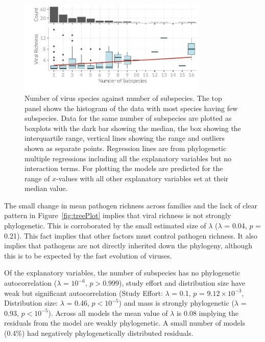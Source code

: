 \begin{knitrout}\footnotesize
{}\color{fgcolor}\begin{figure}[t]

{\centering \includegraphics[width=0.8\textwidth]{figure/boxplot-1} 

}

\caption[Number of virus species against number of subspecies]{Number of virus species against number of subspecies. 		
The top panel shows the histogram of the data with most species having few subspecies.		
Data for the same number of subspecies are plotted as boxplots with the dark bar showing the median, the box showing the interquartile range, vertical lines showing the range and outliers shown as separate points.		
Regression lines are from phylogenetic multiple regressions including all the explanatory variables but no interaction terms.
For plotting the models are predicted for the range of $x$-values with all other explanatory variables set at their median value.			
}\label{fig:boxplot}
\end{figure}


\end{knitrout}


The small change in mean pathogen richness across families and the lack of clear pattern in Figure~\ref{fig:treePlot} implies that viral richness is not strongly phylogenetic. 
This is corroborated by the small estimated size of $\lambda$ ($\lambda$ = 0.04, $p$ = 0.21).
This fact implies that other factors must control pathogen richness.
It also implies that pathogens are not directly inherited down the phylogeny, although this is to be expected by the fast evolution of viruses.

Of the explanatory variables, the number of subspecies has no phylogenetic autocorrelation ($\lambda$ = \ensuremath{10^{-6}}, $p > 0.999$), study effort and distribution size have weak but significant autocorrelation (Study Effort: $\lambda$ = 0.1, $p$ = \ensuremath{9.12\times 10^{-3}}, Distribution size: $\lambda$ = 0.46, $p < 10^{-5}$) and mass is strongly phylogenetic ($\lambda$ = 0.93, $p < 10^{-5}$). 
Across all models the mean value of $\lambda$ is 0.08 implying the residuals from the model are weakly phylogenetic.
A small number of models (0.4\%)  had negatively phylogenetically distributed residuals.




